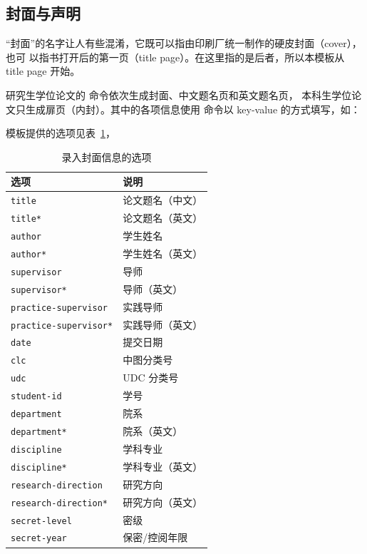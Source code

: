 \documentclass[a4paper]{ltxdoc}
\DeclareRobustCommand\opt{\texttt}
\begin{document}
\subsection{封面与声明}

“封面”的名字让人有些混淆，它既可以指由印刷厂统一制作的硬皮封面（cover），也可
以指书打开后的第一页（title page）。在这里指的是后者，所以本模板从 title page
开始。

\DescribeMacro{\maketitle}
研究生学位论文的  命令依次生成封面、中文题名页和英文题名页，
本科生学位论文只生成扉页（内封）。其中的各项信息使用  命令以
key-value 的方式填写，如：
\begin{latex}
\end{latex}
模板提供的选项见表~\ref{tab:title-page-options}，
\begin{table}
  \centering\small
  \caption{录入封面信息的选项}
  \label{tab:title-page-options}
  \begin{tabular}{ll}
    \toprule
    选项                       & 说明             \\
    \midrule
    \opt{title}                & 论文题名（中文） \\
    \opt{title*}               & 论文题名（英文） \\
    \opt{author}               & 学生姓名         \\
    \opt{author*}              & 学生姓名（英文） \\
    \opt{supervisor}           & 导师             \\
    \opt{supervisor*}          & 导师（英文）     \\
    \opt{practice-supervisor}  & 实践导师         \\
    \opt{practice-supervisor*} & 实践导师（英文） \\
    \opt{date}                 & 提交日期         \\
    \opt{clc}                  & 中图分类号       \\
    \opt{udc}                  & UDC 分类号       \\
    \opt{student-id}           & 学号             \\
    \opt{department}           & 院系             \\
    \opt{department*}          & 院系（英文）     \\
    \opt{discipline}           & 学科专业         \\
    \opt{discipline*}          & 学科专业（英文） \\
    \opt{research-direction}   & 研究方向         \\
    \opt{research-direction*}  & 研究方向（英文） \\
    \opt{secret-level}         & 密级             \\
    \opt{secret-year}          & 保密/控阅年限    \\
    \bottomrule
  \end{tabular}
\end{table}
\end{document}
